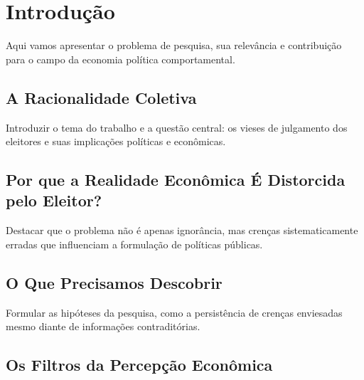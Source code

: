 

\chapter{Introdução} %

Aqui vamos apresentar o problema de pesquisa, sua relevância e contribuição para o campo da economia política comportamental.




\section{A Racionalidade Coletiva} %

Introduzir o tema do trabalho e a questão central: os vieses de julgamento dos eleitores e suas implicações políticas e econômicas.

\section{Por que a Realidade Econômica É Distorcida pelo Eleitor?} %

Destacar que o problema não é apenas ignorância, mas crenças sistematicamente erradas que influenciam a formulação de políticas públicas.

\section{O Que Precisamos Descobrir} %

Formular as hipóteses da pesquisa, como a persistência de crenças enviesadas mesmo diante de informações contraditórias.

\section{Os Filtros da Percepção Econômica} %

